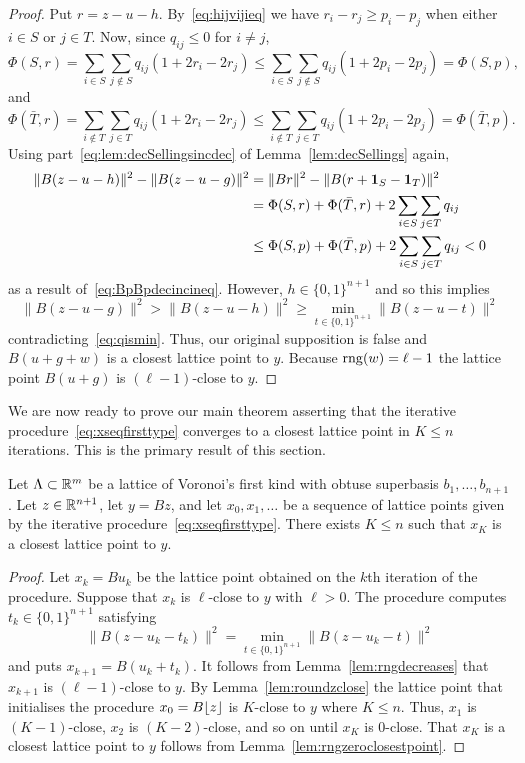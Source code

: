 \documentclass[final,leqno]{siamltex}
\begin{document}
\begin{proof}
Put $r = z - u - h$.  By~\eqref{eq:hijvijieq} we have $r_i - r_j \geq p_{i} - p_{j}$ when either $i \in S$ or $j \in T$.  Now, since $q_{ij} \leq 0$ for $i \neq j$,
\[
\Phi(S,r) = \sum_{i \in S}\sum_{j \notin S}q_{ij}(1 + 2r_i - 2r_j) \leq \sum_{i \in S}\sum_{j \notin S}q_{ij}(1 + 2p_i - 2p_j) = \Phi(S,p),
\]
and
\[
\Phi(\bar{T},r) = \sum_{i \notin T}\sum_{j \in T}q_{ij}(1 + 2r_i - 2r_j) \leq \sum_{i \notin T}\sum_{j \in T}q_{ij}(1 + 2p_i - 2p_j) = \Phi(\bar{T},p).
\]
Using part~\ref{eq:lem:decSellingsincdec} of Lemma~\ref{lem:decSellings} again,
\begin{align*}
\|B(z-u-h)\|^2 - \|B(z-u-g)\|^2 &= \|Br\|^2 - \|B(r+\boldsymbol{1}_S - \boldsymbol{1}_T)\|^2 \\
&= \Phi(S,r) + \Phi(\bar{T},r) + 2\sum_{i\in S}\sum_{j \in T} q_{ij} \\
&\leq \Phi(S,p) + \Phi(\bar{T}, p) + 2\sum_{i\in S}\sum_{j \in T} q_{ij} < 0 
\end{align*}
as a result of~\eqref{eq:BpBpdecincineq}.  However, $h \in \{0,1\}^{n+1}$ and so this implies
\[
\|B(z-u-g)\|^2 > \|B(z-u-h)\|^2 \geq \min_{t \in \{0,1\}^{n+1}}\|B(z - u - t)\|^2
\]
contradicting~\eqref{eq:qismin}.  Thus, our original supposition is false and $B(u+g+w)$ is a closest lattice point to $y$. Because $\operatorname{rng}(w) = \ell-1$ the lattice point $B(u+g)$ is $(\ell-1)$-close to $y$.
 \end{proof}

We are now ready to prove our main theorem asserting that the iterative procedure~\eqref{eq:xseqfirsttype} converges to a closest lattice point in $K \leq n$ iterations.  This is the primary result of this section.

\begin{theorem}\label{thm:mainitrconvthm}
Let $\Lambda \subset {\mathbb R}^m$ be a lattice of Voronoi's first kind with obtuse superbasis $b_1,\dots,b_{n+1}$.  Let $z \in {\mathbb R}^{n+1}$, let $y = Bz$, and let $x_0,x_1,\dots$ be a sequence of lattice points given by the iterative procedure~\eqref{eq:xseqfirsttype}.  There exists $K \leq n$ such that $x_K$ is a closest lattice point to $y$.
\end{theorem}
\begin{proof}
Let $x_k = B u_k$ be the lattice point obtained on the $k$th iteration of the procedure.  Suppose that $x_k$ is $\ell$-close to $y$ with $\ell > 0$.  The procedure computes $t_{k} \in \{0,1\}^{n+1}$ satisfying
\[
\|B(z - u_k - t_{k})\|^2 = \min_{t \in \{0,1\}^{n+1}}\|B(z - u_k - t)\|^2
\]
and puts $x_{k+1} = B(u_k + t_k)$.  It follows from Lemma~\ref{lem:rngdecreases} that $x_{k+1}$ is $(\ell-1)$-close to $y$.  By Lemma~\ref{lem:roundzclose} the lattice point that initialises the procedure $x_0 = B {\left\lfloor z \right\rfloor}$ is $K$-close to $y$ where $K \leq n$.  Thus, $x_1$ is $(K-1)$-close, $x_2$ is $(K-2)$-close, and so on until $x_K$ is $0$-close.  That $x_K$ is a closest lattice point to $y$ follows from Lemma~\ref{lem:rngzeroclosestpoint}.
\end{proof}
\end{document}

